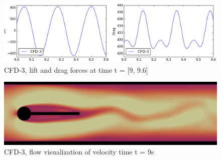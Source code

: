 \begin{figure}[h!]
  \centering
    \includegraphics[scale=0.5]{./Fig/cfd3_liftdrag.png}
      \caption{CFD-3, lift and drag forces at time t = [9, 9.6]}
\end{figure}

\begin{figure}[h!]
  \centering
    \includegraphics[scale=0.2]{./Fig/cfd3.png}
      \caption{CFD-3, flow visualization of velocity time t = 9s}
\end{figure}

\newpage

